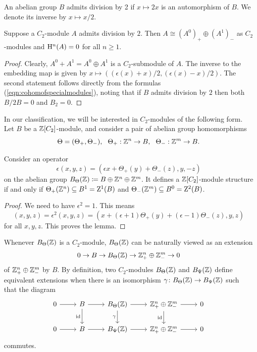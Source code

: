 An abelian group $B$ admits division by 2 if  $x\mapsto 2x$ is an automorphism of $B$. We denote its inverse by $x\mapsto x/2$. 
\begin{lemma} \label{cohom_div_by2}
  Suppose a $C_2$-module $A$ admits division by $2$. Then $A\cong (A^0)_+ \oplus (A^1)_-$ as $C_2$-modules and
  $\mathrm{H}^n(A)=0$ for all $n\geq 1$.  
\end{lemma}
\begin{proof} Clearly,  $A^0 + A^1 = A^0 \oplus A^1$ is a $C_2$-submodule of $A$. The inverse to the embedding map is given by
  $x \mapsto ((\epsilon(x) + x)/2, (\epsilon(x) - x)/2 )$. The second statement follows directly from the formulas (\ref{eqn:cohomofspecialmodules}), noting that if $B$ admits division by $2$ then both $B / 2 B = 0$ and $B_2 = 0$.
\end{proof}  

In our classification, we will be interested in $C_2$-modules of the following form. Let $B$ be a ${\mathbb Z}[C_2]$-module, and consider a pair of abelian group homomorphisms 
  \[
  \Theta = (\Theta_+, \Theta_-), \ \ \Theta_+ : \bZ^n \rightarrow B , \ \  \Theta_- : \bZ^m \rightarrow B .
  \]

\begin{lemma} \label{even_part}
  Consider an operator
  \[\epsilon (x,y,z) = (\epsilon x +\Theta_+ (y) + \Theta_- (z), y, -z)\]
  on the abelian group $B_\Theta ({\mathbb Z}) \coloneqq B \oplus {\mathbb Z}^n \oplus {\mathbb Z}^m$. 
It defines a ${\mathbb Z} [C_2]$-module structure if and only if 
\newline
$\Theta_+ ({\mathbb Z}^n ) \subseteq B^1 = \mathrm{Z}^1 (B)$ and  $\Theta_- ({\mathbb Z}^m) \subseteq B^0=\mathrm{Z}^2(B)$.
\end{lemma}
\begin{proof} We need to have $\epsilon^2=1$. This means  
  \[(x,y,z) = \epsilon^2 (x,y,z) = (x + (\epsilon + 1) \Theta_+ (y) + (\epsilon - 1)\Theta_- (z), y, z)\]
  for all $x,y,z$. This proves the lemma.
\end{proof}

Whenever $B_\Theta ({\mathbb Z})$ is a $C_2$-module, $B_{\Theta}({\mathbb Z})$ can be naturally viewed as an extension
\[
0 \rightarrow B \rightarrow B_\Theta ({\mathbb Z}) \rightarrow {\mathbb Z}^n_+ \oplus {\mathbb Z}^m_- \rightarrow 0
\]
of ${\mathbb Z}^n_+ \oplus {\mathbb Z}^m_-$ by $B$. By definition, two $C_2$-modules $B_\Theta({\mathbb Z})$ and $B_{\Psi}({\mathbb Z})$ define equivalent extensions when there is an isomorphism $\gamma \colon B_\Theta({\mathbb Z}) \rightarrow B_{\Psi}({\mathbb Z})$ such that the diagram
\begin{equation} \label{diagram_BTheta}
  \begin{tikzcd}
	0 & B & {{B}_\Theta(\bZ)} & {\bZ^n_+\oplus \bZ^m_-} & 0 \\
	0 & B & {{B}_\Psi(\bZ)} & {\bZ^n_+\oplus \bZ^m_-} & 0
	\arrow[from=1-1, to=1-2]
	\arrow[from=1-2, to=1-3]
	\arrow["\id"', from=1-2, to=2-2]
	\arrow[from=1-3, to=1-4]
	\arrow["\gamma"', from=1-3, to=2-3]
	\arrow[from=1-4, to=1-5]
	\arrow["\id"', from=1-4, to=2-4]
	\arrow[from=2-1, to=2-2]
	\arrow[from=2-2, to=2-3]
	\arrow[from=2-3, to=2-4]
	\arrow[from=2-4, to=2-5]
\end{tikzcd}\end{equation}
commutes.

